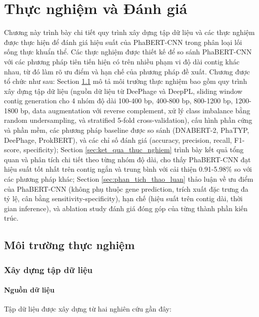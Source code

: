 \chapter{Thực nghiệm và Đánh giá}
\label{chap:thuc_nghiem_danh_gia}

Chương này trình bày chi tiết quy trình xây dựng tập dữ liệu và các thực nghiệm được thực hiện để đánh giá hiệu suất của PhaBERT-CNN trong phân loại lối sống thực khuẩn thể. Các thực nghiệm được thiết kế để so sánh PhaBERT-CNN với các phương pháp tiên tiến hiện có trên nhiều phạm vi độ dài contig khác nhau, từ đó làm rõ ưu điểm và hạn chế của phương pháp đề xuất. Chương được tổ chức như sau: Section \ref{sec:moi_truong_thuc_nghiem} mô tả môi trường thực nghiệm bao gồm quy trình xây dựng tập dữ liệu (nguồn dữ liệu từ DeePhage và DeepPL, sliding window contig generation cho 4 nhóm độ dài 100-400 bp, 400-800 bp, 800-1200 bp, 1200-1800 bp, data augmentation với reverse complement, xử lý class imbalance bằng random undersampling, và stratified 5-fold cross-validation), cấu hình phần cứng và phần mềm, các phương pháp baseline được so sánh (DNABERT-2, PhaTYP, DeePhage, ProkBERT), và các chỉ số đánh giá (accuracy, precision, recall, F1-score, specificity); Section \ref{sec:ket_qua_thuc_nghiem} trình bày kết quả tổng quan và phân tích chi tiết theo từng nhóm độ dài, cho thấy PhaBERT-CNN đạt hiệu suất tốt nhất trên contig ngắn và trung bình với cải thiện 0.91-5.98\% so với các phương pháp khác; Section \ref{sec:phan_tich_thao_luan} thảo luận về ưu điểm của PhaBERT-CNN (không phụ thuộc gene prediction, trích xuất đặc trưng đa tỷ lệ, cân bằng sensitivity-specificity), hạn chế (hiệu suất trên contig dài, thời gian inference), và ablation study đánh giá đóng góp của từng thành phần kiến trúc.

\section{Môi trường thực nghiệm}
\label{sec:moi_truong_thuc_nghiem}

\subsection{Xây dựng tập dữ liệu}
\label{subsec:dataset_construction}

\subsubsection{Nguồn dữ liệu}

Tập dữ liệu được xây dựng từ hai nghiên cứu gần đây:

